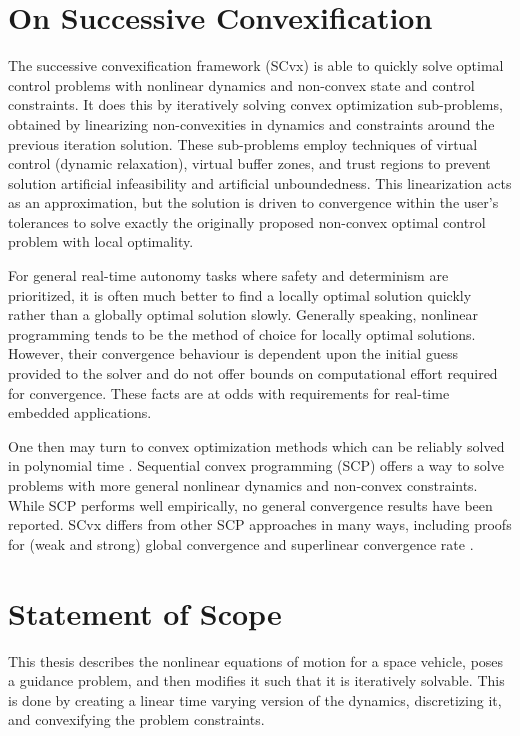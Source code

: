 \section{On Successive Convexification}
The successive convexification framework (SCvx) is able to quickly solve optimal control problems with nonlinear dynamics and non-convex state and control constraints. It does this by iteratively solving convex optimization sub-problems, obtained by linearizing non-convexities in dynamics and constraints around the previous iteration solution. These sub-problems employ techniques of virtual control (dynamic relaxation), virtual buffer zones, and trust regions to prevent solution artificial infeasibility and artificial unboundedness. This linearization acts as an approximation, but the solution is driven to convergence within the user's tolerances to solve exactly the originally proposed non-convex optimal control problem with local optimality.

For general real-time autonomy tasks where safety and determinism are prioritized, it is often much better to find a locally optimal solution quickly rather than a globally optimal solution slowly. Generally speaking, nonlinear programming tends to be the method of choice for locally optimal solutions. However, their convergence behaviour is dependent upon the initial guess provided to the solver and do not offer bounds on computational effort required for convergence. These facts are at odds with requirements for real-time embedded applications.

One then may turn to convex optimization methods which can be reliably solved in polynomial time \cite{nesterov1994interior}. Sequential convex programming (SCP) offers a way to solve problems with more general nonlinear dynamics and non-convex constraints. While SCP performs well empirically, no general convergence results have been reported. SCvx differs from other SCP approaches in many ways, including proofs for (weak and strong) global convergence and superlinear convergence rate \cite{mao2016successive}.




\section{Statement of Scope}
This thesis describes the nonlinear equations of motion for a space vehicle, poses a guidance problem, and then modifies it such that it is iteratively solvable. This is done by creating a linear time varying version of the dynamics, discretizing it, and convexifying the problem constraints. 


